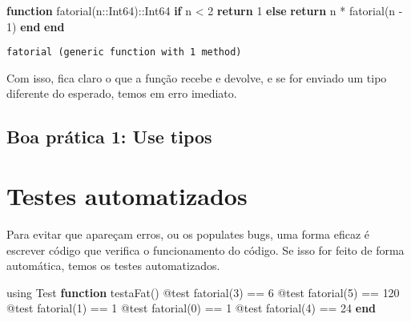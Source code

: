 \documentclass[
  letterpaper,
  DIV=11,
  numbers=noendperiod]{scrreprt}
\newenvironment{Shaded}{\begin{snugshade}}{\end{snugshade}}
\newcommand{\BuiltInTok}[1]{\textcolor[rgb]{0.00,0.23,0.31}{#1}}
\newcommand{\ControlFlowTok}[1]{\textcolor[rgb]{0.00,0.23,0.31}{\textbf{#1}}}
\newcommand{\DataTypeTok}[1]{\textcolor[rgb]{0.68,0.00,0.00}{#1}}
\newcommand{\FloatTok}[1]{\textcolor[rgb]{0.68,0.00,0.00}{#1}}
\newcommand{\FunctionTok}[1]{\textcolor[rgb]{0.28,0.35,0.67}{#1}}
\newcommand{\ImportTok}[1]{\textcolor[rgb]{0.00,0.46,0.62}{#1}}
\newcommand{\KeywordTok}[1]{\textcolor[rgb]{0.00,0.23,0.31}{\textbf{#1}}}
\newcommand{\NormalTok}[1]{\textcolor[rgb]{0.00,0.23,0.31}{#1}}
\newcommand{\OperatorTok}[1]{\textcolor[rgb]{0.37,0.37,0.37}{#1}}
\newcommand{\PreprocessorTok}[1]{\textcolor[rgb]{0.68,0.00,0.00}{#1}}
\begin{document}
\begin{Shaded}
\begin{Highlighting}[]
\KeywordTok{function} \FunctionTok{fatorial}\NormalTok{(n}\OperatorTok{::}\DataTypeTok{Int64}\NormalTok{)}\OperatorTok{::}\DataTypeTok{Int64}
    \ControlFlowTok{if}\NormalTok{ n }\OperatorTok{\textless{}} \FloatTok{2} 
        \ControlFlowTok{return} \FloatTok{1}
    \ControlFlowTok{else}  
        \ControlFlowTok{return}\NormalTok{ n }\OperatorTok{*} \FunctionTok{fatorial}\NormalTok{(n }\OperatorTok{{-}} \FloatTok{1}\NormalTok{)}
    \ControlFlowTok{end}
\KeywordTok{end}
\end{Highlighting}
\end{Shaded}

\begin{verbatim}
fatorial (generic function with 1 method)
\end{verbatim}

Com isso, fica claro o que a função recebe e devolve, e se for enviado
um tipo diferente do esperado, temos em erro imediato.

\subsection{Boa prática 1: Use tipos}\label{boa-pruxe1tica-1-use-tipos}

\section{Testes automatizados}\label{testes-automatizados}

Para evitar que apareçam erros, ou os populates bugs, uma forma eficaz é
escrever código que verifica o funcionamento do código. Se isso for
feito de forma automática, temos os testes automatizados.

\begin{Shaded}
\begin{Highlighting}[]
\ImportTok{using} \BuiltInTok{Test}
\KeywordTok{function} \FunctionTok{testaFat}\NormalTok{()}
  \PreprocessorTok{@test} \FunctionTok{fatorial}\NormalTok{(}\FloatTok{3}\NormalTok{) }\OperatorTok{==} \FloatTok{6}
  \PreprocessorTok{@test} \FunctionTok{fatorial}\NormalTok{(}\FloatTok{5}\NormalTok{) }\OperatorTok{==} \FloatTok{120}
  \PreprocessorTok{@test} \FunctionTok{fatorial}\NormalTok{(}\FloatTok{1}\NormalTok{) }\OperatorTok{==} \FloatTok{1}
  \PreprocessorTok{@test} \FunctionTok{fatorial}\NormalTok{(}\FloatTok{0}\NormalTok{) }\OperatorTok{==} \FloatTok{1}
  \PreprocessorTok{@test} \FunctionTok{fatorial}\NormalTok{(}\FloatTok{4}\NormalTok{) }\OperatorTok{==} \FloatTok{24}
\KeywordTok{end}
\end{Highlighting}
\end{Shaded}
\end{document}
